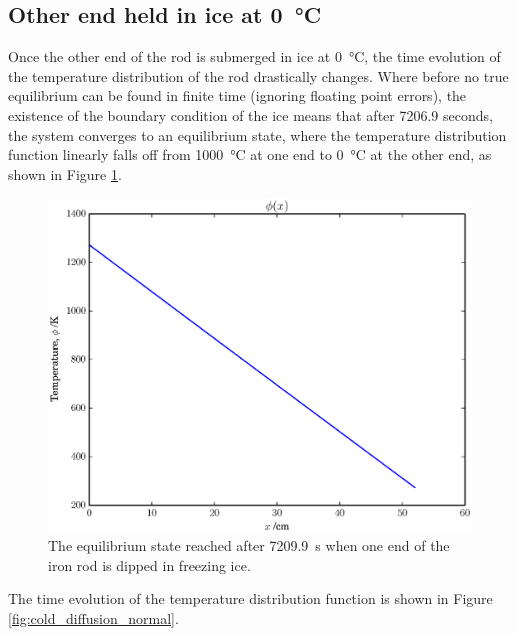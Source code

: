 \subsection{Other end held in ice at \SI{0}{\celsius}}
\label{subsec:cold}

Once the other end of the rod is submerged in ice at \SI{0}{\celsius}, the time evolution of the temperature distribution of the rod drastically changes. Where before no true equilibrium can be found in finite time (ignoring floating point errors), the existence of the boundary condition of the ice means that after 7206.9 seconds, the system converges to an equilibrium state, where the temperature distribution function linearly falls off from \SI{1000}{\celsius} at one end to \SI{0}{\celsius} at the other end, as shown in Figure \ref{fig:cold_equilibrium}.

\begin{figure}
    \centering
    \includegraphics[width=\linewidth]{graphs/diffusion/cold/cold_equilibrium_rod_normal}
    \caption{The equilibrium state reached after \SI{7209.9}{\second} when one end of the iron rod is dipped in freezing ice.}
    \label{fig:cold_equilibrium}
\end{figure}

The time evolution of the temperature distribution function is shown in Figure \ref{fig:cold_diffusion_normal}.

